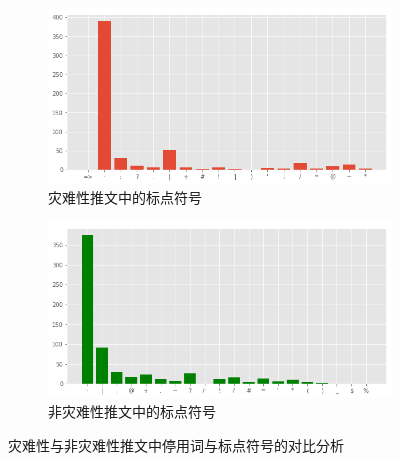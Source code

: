 \begin{figure}[htbp]
    \begin{subfigure}[b]{0.48\textwidth}
        \centering
        \includegraphics[width=\textwidth]{figures/LSTM7.png}
        \caption{灾难性推文中的标点符号}
        \label{fig:punct_disaster}
    \end{subfigure}
    \hfill
    \begin{subfigure}[b]{0.48\textwidth}
        \centering
        \includegraphics[width=\textwidth]{figures/LSTM8.png}
        \caption{非灾难性推文中的标点符号}
        \label{fig:punct_non_disaster}
    \end{subfigure}
    \caption{灾难性与非灾难性推文中停用词与标点符号的对比分析}
    \label{fig:lstm_eda_stop_punct}
\end{figure}

